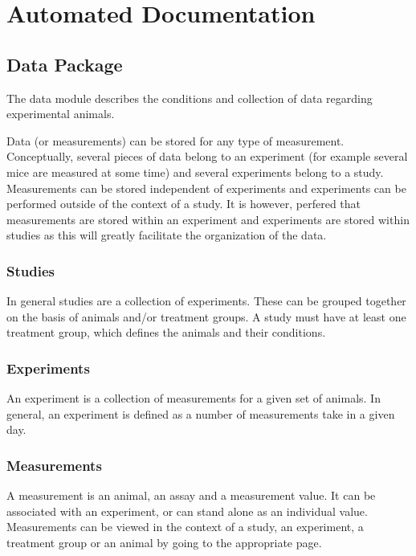 \documentclass[letterpaper,10pt,english]{sphinxmanual}
\begin{document}
\chapter{Automated Documentation}
\label{api:automated-documentation}\label{api::doc}

\section{Data Package}
\label{api:data-package}\label{api:module-data}
The data module describes the conditions and collection of data regarding experimental animals.

Data (or measurements) can be stored for any type of measurement.  Conceptually, several pieces of data belong to an experiment (for example several mice are measured at some time) and several experiments belong to a study.  Measurements can be stored independent of experiments and experiments can be performed outside of the context of a study.  It is however, perfered that measurements are stored within an experiment and experiments are stored within studies as this will greatly facilitate the organization of the data.


\subsection{Studies}
\label{api:studies}
In general studies are a collection of experiments.  These can be grouped together on the basis of animals and/or treatment groups.  A study must have at least one treatment group, which defines the animals and their conditions.


\subsection{Experiments}
\label{api:experiments}
An experiment is a collection of measurements for a given set of animals.  In general, an experiment is defined as a number of measurements take in a given day.


\subsection{Measurements}
\label{api:measurements}
A measurement is an animal, an assay and a measurement value.  It can be associated with an experiment, or can stand alone as an individual value.  Measurements can be viewed in the context of a study, an experiment, a treatment group or an animal by going to the appropriate page.
\end{document}
